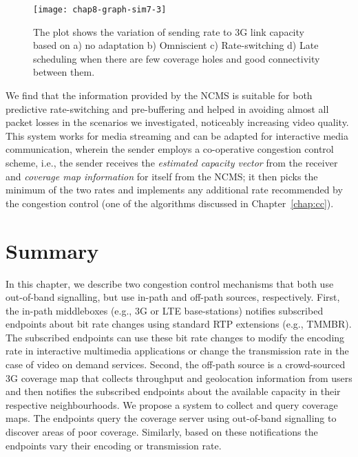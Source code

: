 \begin{figure}[!t]
\texttt{[image: chap8-graph-sim7-3]}
  \caption{The plot shows the variation of sending rate to 3G link capacity
  based on a) no adaptation b) Omniscient c) Rate-switching d) Late scheduling
  when there are few coverage holes and good connectivity between them.}
\label{fig:glass:sim7res}
\end{figure}


We find that the information provided by the NCMS is suitable for both
predictive rate-switching and  pre-buffering and helped in avoiding almost all
packet losses in the scenarios we investigated, noticeably increasing video
quality. This system works for media streaming and can be adapted for
interactive media communication, wherein the sender employs a co-operative
congestion control scheme, i.e., the sender receives the \emph{estimated
capacity vector} from the receiver and \emph{coverage map information} for
itself from the NCMS; it then picks the minimum of the two rates and implements any
additional rate recommended by the congestion control (one of the algorithms
discussed in Chapter~\ref{chap:cc}).

\section{Summary}

In this chapter, we describe two congestion control mechanisms that both use
out-of-band signalling, but use in-path and off-path sources, respectively.
First, the in-path middleboxes (e.g., 3G or LTE base-stations) notifies
subscribed  endpoints about bit rate changes using standard RTP extensions
(e.g., TMMBR). The subscribed endpoints can use these bit rate changes to
modify the encoding rate in interactive multimedia applications or change
the transmission rate in the case of video on demand services.
%
Second, the off-path source is a crowd-sourced 3G coverage map that collects
throughput and geolocation information from users and then notifies the
subscribed endpoints about the available capacity in their respective
neighbourhoods. We propose a system to collect and query coverage maps. The
endpoints query the coverage server using out-of-band signalling to discover
areas of poor coverage. Similarly, based on these notifications the endpoints
vary their encoding or transmission rate.

